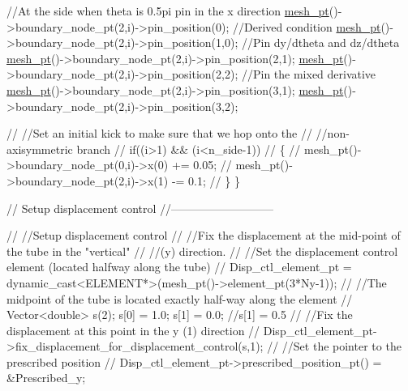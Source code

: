 \begin{DoxyCodeInclude}
   \textcolor{comment}{//At the side when theta is 0.5pi  pin in the x direction}
   \hyperlink{classShellProblem_a1905a1b913469ed54f7c8f55d133ff57}{mesh\_pt}()->boundary\_node\_pt(2,i)->pin\_position(0);
   \textcolor{comment}{//Derived condition}
   \hyperlink{classShellProblem_a1905a1b913469ed54f7c8f55d133ff57}{mesh\_pt}()->boundary\_node\_pt(2,i)->pin\_position(1,0);
   \textcolor{comment}{//Pin dy/dtheta and dz/dtheta}
   \hyperlink{classShellProblem_a1905a1b913469ed54f7c8f55d133ff57}{mesh\_pt}()->boundary\_node\_pt(2,i)->pin\_position(2,1);
   \hyperlink{classShellProblem_a1905a1b913469ed54f7c8f55d133ff57}{mesh\_pt}()->boundary\_node\_pt(2,i)->pin\_position(2,2);
   \textcolor{comment}{//Pin the mixed derivative}
   \hyperlink{classShellProblem_a1905a1b913469ed54f7c8f55d133ff57}{mesh\_pt}()->boundary\_node\_pt(2,i)->pin\_position(3,1);
   \hyperlink{classShellProblem_a1905a1b913469ed54f7c8f55d133ff57}{mesh\_pt}()->boundary\_node\_pt(2,i)->pin\_position(3,2);

\textcolor{comment}{//    //Set an initial kick to make sure that we hop onto the}
\textcolor{comment}{//    //non-axisymmetric branch}
\textcolor{comment}{//    if((i>1) && (i<n\_side-1))}
\textcolor{comment}{//     \{}
\textcolor{comment}{//      mesh\_pt()->boundary\_node\_pt(0,i)->x(0) += 0.05;}
\textcolor{comment}{//      mesh\_pt()->boundary\_node\_pt(2,i)->x(1) -= 0.1;}
\textcolor{comment}{//     \}}
  \}


 \textcolor{comment}{// Setup displacement control}
 \textcolor{comment}{//---------------------------}



\textcolor{comment}{//  //Setup displacement control}
\textcolor{comment}{//  //Fix the displacement at the mid-point of the tube in the "vertical"}
\textcolor{comment}{//  //(y) direction.}
\textcolor{comment}{//  //Set the displacement control element (located halfway along the tube)}
\textcolor{comment}{// Disp\_ctl\_element\_pt = dynamic\_cast<ELEMENT*>(mesh\_pt()->element\_pt(3*Ny-1));}
\textcolor{comment}{//  //The midpoint of the tube is located exactly half-way along the element}
\textcolor{comment}{//  Vector<double> s(2);  s[0] = 1.0; s[1] = 0.0; //s[1] = 0.5}
\textcolor{comment}{//  //Fix the displacement at this point in the y (1) direction}
\textcolor{comment}{//  Disp\_ctl\_element\_pt->fix\_displacement\_for\_displacement\_control(s,1);}
\textcolor{comment}{//  //Set the pointer to the prescribed position}
\textcolor{comment}{//  Disp\_ctl\_element\_pt->prescribed\_position\_pt() = &Prescribed\_y; }
 



\end{DoxyCodeInclude}
